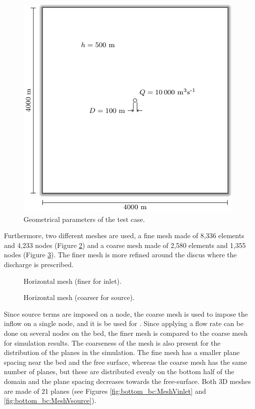 \begin{figure}[t!]
\begin{center}
	\includegraphics[]{GeomPlan.pdf}
\end{center}
\caption{Geometrical parameters of the test case.}
\label{fig:GeomPlan}
\end{figure}

Furthermore, two different meshes are used, a fine mesh made of 8,336 elements
and 4,233 nodes (Figure \ref{fig:bottom_bc:MeshHinlet}) and a coarse mesh
made of 2,580 elements and 1,355 nodes (Figure \ref{fig:bottom_bc:MeshHsource}).
The finer mesh is more refined around the discus where the discharge is
prescribed.

\begin{figure}[H]
 \centering
  \caption{Horizontal mesh (finer for inlet).}\label{fig:bottom_bc:MeshHinlet}
\end{figure}

\begin{figure}[H]
 \centering
  \caption{Horizontal mesh (coarser for source).}\label{fig:bottom_bc:MeshHsource}
\end{figure}

Since source terms are imposed on a node, the coarse mesh is used to impose the
inflow on a single node, and it is be used for .
Since applying a flow rate can be done on several nodes on the bed,
the finer mesh is compared to the coarse mesh for 
simulation results.
The coarseness of the mesh is also present for the distribution of the planes
in the simulation.
The fine mesh has a smaller plane spacing near the bed and the free surface,
whereas the coarse mesh has the same number of planes, but these are
distributed evenly on the bottom half of the domain and the plane spacing
decreases towards the free-surface.
Both 3D meshes are made of 21 planes (see Figures \ref{fig:bottom_bc:MeshVinlet} and \ref{fig:bottom_bc:MeshVsource}).


